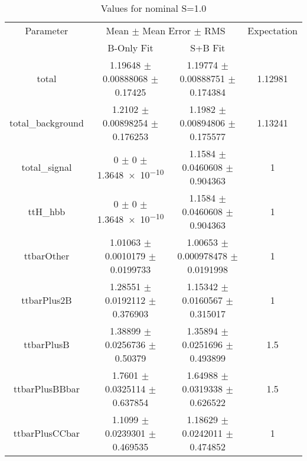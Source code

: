\begin{table}
\centering
\caption{Values for nominal S=1.0}
\begin{tabular}{cccc}
\toprule
Parameter & \multicolumn{2}{c}{Mean $\pm$ Mean Error $\pm$ RMS} & Expectation\\
 & B-Only Fit & S+B Fit & \\
\midrule
total & \num{1.19648} $\pm$ \num{0.00888068} $\pm$ \num{0.17425} & \num{1.19774} $\pm$ \num{0.00888751} $\pm$ \num{0.174384} & \num{1.12981}\\
total\_background & \num{1.2102} $\pm$ \num{0.00898254} $\pm$ \num{0.176253} & \num{1.1982} $\pm$ \num{0.00894806} $\pm$ \num{0.175577} & \num{1.13241}\\
total\_signal & \num{0} $\pm$ \num{0} $\pm$ \num{1.3648e-10} & \num{1.1584} $\pm$ \num{0.0460608} $\pm$ \num{0.904363} & \num{1}\\
ttH\_hbb & \num{0} $\pm$ \num{0} $\pm$ \num{1.3648e-10} & \num{1.1584} $\pm$ \num{0.0460608} $\pm$ \num{0.904363} & \num{1}\\
ttbarOther & \num{1.01063} $\pm$ \num{0.0010179} $\pm$ \num{0.0199733} & \num{1.00653} $\pm$ \num{0.000978478} $\pm$ \num{0.0191998} & \num{1}\\
ttbarPlus2B & \num{1.28551} $\pm$ \num{0.0192112} $\pm$ \num{0.376903} & \num{1.15342} $\pm$ \num{0.0160567} $\pm$ \num{0.315017} & \num{1}\\
ttbarPlusB & \num{1.38899} $\pm$ \num{0.0256736} $\pm$ \num{0.50379} & \num{1.35894} $\pm$ \num{0.0251696} $\pm$ \num{0.493899} & \num{1.5}\\
ttbarPlusBBbar & \num{1.7601} $\pm$ \num{0.0325114} $\pm$ \num{0.637854} & \num{1.64988} $\pm$ \num{0.0319338} $\pm$ \num{0.626522} & \num{1.5}\\
ttbarPlusCCbar & \num{1.1099} $\pm$ \num{0.0239301} $\pm$ \num{0.469535} & \num{1.18629} $\pm$ \num{0.0242011} $\pm$ \num{0.474852} & \num{1}\\
\bottomrule
\end{tabular}
\end{table}